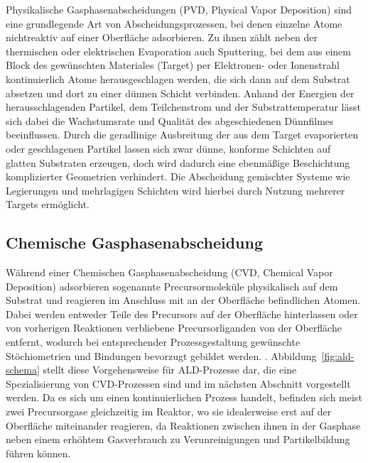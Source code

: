 Physikalische Gasphasenabscheidungen (PVD, Physical Vapor Deposition) sind eine grundlegende Art von Abscheidungsprozessen, bei denen einzelne Atome nichtreaktiv auf einer Oberfläche adsorbieren.
Zu ihnen zählt neben der thermischen oder elektrischen Evaporation auch Sputtering, bei dem aus einem Block des gewünschten Materiales (Target) per Elektronen- oder Ionenstrahl kontinuierlich Atome herausgeschlagen werden, die sich dann auf dem Substrat absetzen und dort zu einer dünnen Schicht verbinden\cite{mattox_handbook_2010,helmersson_ionized_2006}.
Anhand der Energien der herausschlagenden Partikel, dem Teilchenstrom und der Substrattemperatur lässt sich dabei die Wachstumsrate und Qualität des abgeschiedenen Dünnfilmes beeinflussen.
Durch die geradlinige Ausbreitung der aus dem Target evaporierten oder geschlagenen Partikel lassen sich zwar dünne, konforme Schichten auf glatten Substraten erzeugen\cite{svorcik_annealing_2011}, doch wird dadurch eine ebenmäßige Beschichtung komplizierter Geometrien verhindert.
Die Abscheidung gemischter Systeme wie Legierungen und mehrlagigen Schichten wird hierbei durch Nutzung mehrerer Targets ermöglicht\cite{cammarata_nanoindentation_1990}.

\subsection{Chemische Gasphasenabscheidung}

Während einer Chemischen Gasphasenabscheidung (CVD, Chemical Vapor Deposition) adsorbieren sogenannte Precursormoleküle physikalisch auf dem Substrat und reagieren im Anschluss mit an der Oberfläche befindlichen Atomen.
Dabei werden entweder Teile des Precursors auf der Oberfläche hinterlassen oder von vorherigen Reaktionen verbliebene Precursorliganden von der Oberfläche entfernt, wodurch bei entsprechender Prozessgestaltung gewünschte Stöchiometrien und Bindungen bevorzugt gebildet werden\cite{pierson_handbook_1999}.
.
Abbildung~\ref{fig:ald-schema} stellt diese Vorgehensweise für ALD-Prozesse dar, die eine Spezialisierung von CVD-Prozessen sind und im nächsten Abschnitt vorgestellt werden.
Da es sich um einen kontinuierlichen Prozess handelt, befinden sich meist zwei Precursorgase gleichzeitig im Reaktor, wo sie idealerweise erst auf der Oberfläche miteinander reagieren, da Reaktionen zwischen ihnen in der Gasphase neben einem erhöhtem Gasverbrauch zu Verunreinigungen und Partikelbildung führen können.

